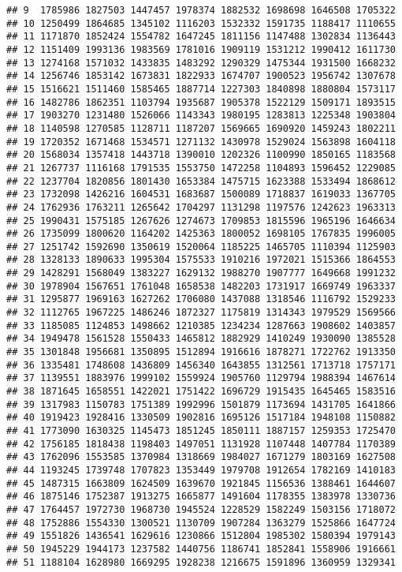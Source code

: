 \documentclass[
]{article}
\begin{document}
\begin{verbatim}
## 9  1785986 1827503 1447457 1978374 1882532 1698698 1646508 1705322
## 10 1250499 1864685 1345102 1116203 1532332 1591735 1188417 1110655
## 11 1171870 1852424 1554782 1647245 1811156 1147488 1302834 1136443
## 12 1151409 1993136 1983569 1781016 1909119 1531212 1990412 1611730
## 13 1274168 1571032 1433835 1483292 1290329 1475344 1931500 1668232
## 14 1256746 1853142 1673831 1822933 1674707 1900523 1956742 1307678
## 15 1516621 1511460 1585465 1887714 1227303 1840898 1880804 1573117
## 16 1482786 1862351 1103794 1935687 1905378 1522129 1509171 1893515
## 17 1903270 1231480 1526066 1143343 1980195 1283813 1225348 1903804
## 18 1140598 1270585 1128711 1187207 1569665 1690920 1459243 1802211
## 19 1720352 1671468 1534571 1271132 1430978 1529024 1563898 1604118
## 20 1568034 1357418 1443718 1390010 1202326 1100990 1850165 1183568
## 21 1267737 1116168 1791535 1553750 1472258 1104893 1596452 1229085
## 22 1237704 1820856 1801430 1653384 1475715 1623388 1533494 1868612
## 23 1732098 1426216 1604531 1683687 1500089 1718837 1619033 1367705
## 24 1762936 1763211 1265642 1704297 1131298 1197576 1242623 1963313
## 25 1990431 1575185 1267626 1274673 1709853 1815596 1965196 1646634
## 26 1735099 1800620 1164202 1425363 1800052 1698105 1767835 1996005
## 27 1251742 1592690 1350619 1520064 1185225 1465705 1110394 1125903
## 28 1328133 1890633 1995304 1575533 1910216 1972021 1515366 1864553
## 29 1428291 1568049 1383227 1629132 1988270 1907777 1649668 1991232
## 30 1978904 1567651 1761048 1658538 1482203 1731917 1669749 1963337
## 31 1295877 1969163 1627262 1706080 1437088 1318546 1116792 1529233
## 32 1112765 1967225 1486246 1872327 1175819 1314343 1979529 1569566
## 33 1185085 1124853 1498662 1210385 1234234 1287663 1908602 1403857
## 34 1949478 1561528 1550433 1465812 1882929 1410249 1930090 1385528
## 35 1301848 1956681 1350895 1512894 1916616 1878271 1722762 1913350
## 36 1335481 1748608 1436809 1456340 1643855 1312561 1713718 1757171
## 37 1139551 1883976 1999102 1559924 1905760 1129794 1988394 1467614
## 38 1871645 1658551 1422021 1751422 1696729 1915435 1645465 1583516
## 39 1317983 1150783 1751389 1992996 1501879 1173694 1431705 1641866
## 40 1919423 1928416 1330509 1902816 1695126 1517184 1948108 1150882
## 41 1773090 1630325 1145473 1851245 1850111 1887157 1259353 1725470
## 42 1756185 1818438 1198403 1497051 1131928 1107448 1407784 1170389
## 43 1762096 1553585 1370984 1318669 1984027 1671279 1803169 1627508
## 44 1193245 1739748 1707823 1353449 1979708 1912654 1782169 1410183
## 45 1487315 1663809 1624509 1639670 1921845 1156536 1388461 1644607
## 46 1875146 1752387 1913275 1665877 1491604 1178355 1383978 1330736
## 47 1764457 1972730 1968730 1945524 1228529 1582249 1503156 1718072
## 48 1752886 1554330 1300521 1130709 1907284 1363279 1525866 1647724
## 49 1551826 1436541 1629616 1230866 1512804 1985302 1580394 1979143
## 50 1945229 1944173 1237582 1440756 1186741 1852841 1558906 1916661
## 51 1188104 1628980 1669295 1928238 1216675 1591896 1360959 1329341
\end{verbatim}
\end{document}
